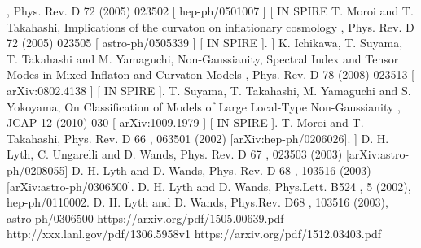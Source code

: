 \documentclass[amssymb,twocolumn,prd,nofootinbib,showpacs]{revtex4-1}
\begin{document}
\begin{thebibliography}{9}
,
Phys. Rev.
D 72
(2005) 023502
[
hep-ph/0501007
] [
IN
SPIRE
 T. Moroi and T. Takahashi,
Implications of the curvaton on inflationary cosmology
,
Phys. Rev.
D 72
(2005) 023505
[
astro-ph/0505339
] [
IN
SPIRE
].
] K. Ichikawa, T. Suyama, T. Takahashi and M. Yamaguchi,
Non-Gaussianity, Spectral Index
and Tensor Modes in Mixed Inflaton and Curvaton Models
,
Phys. Rev.
D 78
(2008) 023513
[
arXiv:0802.4138
] [
IN
SPIRE
].
T. Suyama, T. Takahashi, M. Yamaguchi and S. Yokoyama,
On Classification of Models of
Large Local-Type Non-Gaussianity
,
JCAP
12
(2010) 030
[
arXiv:1009.1979
] [
IN
SPIRE
].
T. Moroi and T. Takahashi, Phys. Rev. D
66
, 063501 (2002) [arXiv:hep-ph/0206026].
] D. H. Lyth, C. Ungarelli and D. Wands, Phys. Rev. D
67
, 023503 (2003)
[arXiv:astro-ph/0208055]
 D. H. Lyth and D. Wands, Phys. Rev. D
68
, 103516 (2003) [arXiv:astro-ph/0306500].
  D. H. Lyth and D. Wands, Phys.Lett.
B524
, 5 (2002),
hep-ph/0110002.
  D.  H.  Lyth  and  D.  Wands,  Phys.Rev.
D68
,  103516
(2003), astro-ph/0306500
https://arxiv.org/pdf/1505.00639.pdf
http://xxx.lanl.gov/pdf/1306.5958v1
https://arxiv.org/pdf/1512.03403.pdf
\end{thebibliography}
\end{document}
